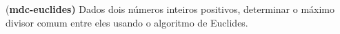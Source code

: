 \item{(\bf mdc-euclides)}
		Dados dois números inteiros positivos, determinar o máximo divisor comum entre eles usando o algoritmo de Euclides.

